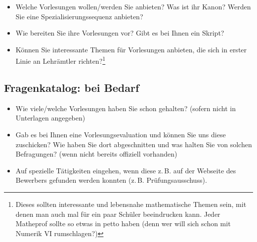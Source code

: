 \begin{itemize}
    \item Welche Vorlesungen wollen/werden Sie anbieten? Was ist ihr Kanon? Werden Sie eine Spezialisierungssequenz anbieten?
    \item Wie bereiten Sie ihre Vorlesungen vor? Gibt es bei Ihnen ein Skript?
    \item Können Sie interessante Themen für Vorlesungen anbieten, die sich in erster Linie an Lehrämtler richten?\footnote{Dieses sollten interessante und lebensnahe mathematische Themen sein, mit denen man auch mal für ein paar Schüler beeindrucken kann. Jeder Matheprof sollte so etwas in petto haben (denn wer will sich schon mit Numerik VI rumschlagen?)}
\end{itemize}

\subsection{Fragenkatalog: bei Bedarf}
\begin{itemize}
    \item Wie viele/welche Vorlesungen haben Sie schon gehalten? (sofern nicht in Unterlagen angegeben)
    \item Gab es bei Ihnen eine Vorlesungsevaluation und können Sie uns diese zuschicken? Wie haben Sie dort abgeschnitten und was halten Sie von solchen Befragungen? (wenn nicht bereits offiziell vorhanden)
    \item Auf spezielle Tätigkeiten eingehen, wenn diese z.\,B. auf der Webseite des Bewerbers gefunden werden konnten (z.\,B. Prüfungsausschuss).
\end{itemize}

